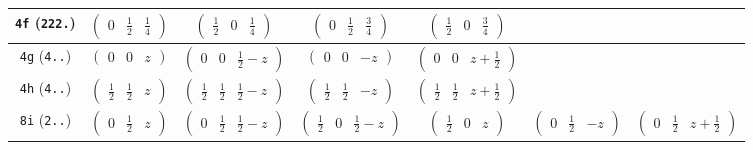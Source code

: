 \documentclass[fleqn,9pt,landscape]{jsarticle}
\begin{document}
\begin{center}
\begin{longtable}{ccccccc}
{\tt 4f} ({\tt 222.}) & $ \begin{pmatrix} 0 & \frac{1}{2} & \frac{1}{4} \end{pmatrix} $ & $ \begin{pmatrix} \frac{1}{2} & 0 & \frac{1}{4} \end{pmatrix} $ & $ \begin{pmatrix} 0 & \frac{1}{2} & \frac{3}{4} \end{pmatrix} $ & $ \begin{pmatrix} \frac{1}{2} & 0 & \frac{3}{4} \end{pmatrix} $ & $  $ & $  $ \\ \hline
{\tt 4g} ({\tt 4..}) & $ \begin{pmatrix} 0 & 0 & z \end{pmatrix} $ & $ \begin{pmatrix} 0 & 0 & \frac{1}{2} - z \end{pmatrix} $ & $ \begin{pmatrix} 0 & 0 & - z \end{pmatrix} $ & $ \begin{pmatrix} 0 & 0 & z + \frac{1}{2} \end{pmatrix} $ & $  $ & $  $ \\ \hline
{\tt 4h} ({\tt 4..}) & $ \begin{pmatrix} \frac{1}{2} & \frac{1}{2} & z \end{pmatrix} $ & $ \begin{pmatrix} \frac{1}{2} & \frac{1}{2} & \frac{1}{2} - z \end{pmatrix} $ & $ \begin{pmatrix} \frac{1}{2} & \frac{1}{2} & - z \end{pmatrix} $ & $ \begin{pmatrix} \frac{1}{2} & \frac{1}{2} & z + \frac{1}{2} \end{pmatrix} $ & $  $ & $  $ \\ \hline
{\tt 8i} ({\tt 2..}) & $ \begin{pmatrix} 0 & \frac{1}{2} & z \end{pmatrix} $ & $ \begin{pmatrix} 0 & \frac{1}{2} & \frac{1}{2} - z \end{pmatrix} $ & $ \begin{pmatrix} \frac{1}{2} & 0 & \frac{1}{2} - z \end{pmatrix} $ & $ \begin{pmatrix} \frac{1}{2} & 0 & z \end{pmatrix} $ & $ \begin{pmatrix} 0 & \frac{1}{2} & - z \end{pmatrix} $ & $ \begin{pmatrix} 0 & \frac{1}{2} & z + \frac{1}{2} \end{pmatrix} $ \\

\end{longtable}
\end{center}
\end{document}
